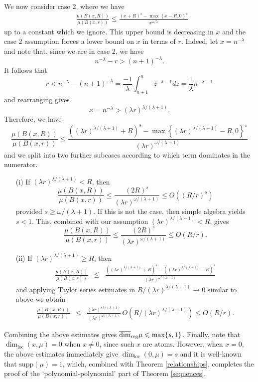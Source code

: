 \documentclass[12pt]{amsart}
\numberwithin{equation}{section}
\renewcommand{\le}{\leqslant}
\renewcommand{\geq}{\geqslant}
\renewcommand{\r}{\overline{\dim}_{\textup{reg}} \mu}
\begin{document}
We now consider case 2, where we have
\begin{align*}
&\frac{\mu(B(x,R))}{\mu(B(x,r))} \le \frac{(x+R)^{s}-\max\left\{x-R,0\right\}^{s}}{x^{\omega/\lambda}}
\end{align*}
up to a constant which we ignore.  This upper bound is decreasing in $x$ and the case 2 assumption forces a lower bound on $x$ in terms of $r$.  Indeed, let $x=n^{-\lambda}$ and note that, since we are in case 2, we have
\[
n^{-\lambda}-  r > (n+1)^{-\lambda}.
\]
It follows that 
\[
r<  n^{-\lambda}- (n+1)^{-\lambda} =  \frac{-1}{\lambda}\int_{n+1}^n z^{-\lambda-1}dz = \frac{1}{\lambda} n^{-\lambda-1}
\]
and rearranging gives
\[
x= n^{-\lambda} > (\lambda r )^{\lambda/(\lambda +1)}.
\]
Therefore, we have
\[
\frac{\mu(B(x,R))}{\mu(B(x,r))} \le   \frac{((\lambda r )^{\lambda/(\lambda +1)}+R)^{s}-\max\left\{(\lambda r )^{\lambda/(\lambda +1)}-R,0\right\}^{s}}{(\lambda r )^{\omega/(\lambda +1)}}
\]
and we split into two further subcases according to which term dominates in the numerator.
\begin{enumerate}
\item[(i)] If $(\lambda r)^{\lambda/(\lambda+1)}<R$, then
\[
\frac{\mu(B(x,R))}{\mu(B(x,r))} \le \frac{(2R)^{s} }{ (\lambda r )^{\omega/(\lambda +1)}}  \le O \left( (R/r)^s \right)
\]
provided $s \geq \omega/(\lambda +1)$.  If this is not the case, then simple algebra yields $s < 1$.  This, combined with our assumption  $(\lambda r)^{\lambda/(\lambda+1)}<R$, gives
\[
\frac{\mu(B(x,R))}{\mu(B(x,r))} \le \frac{(2R)^{s} }{ (\lambda r )^{\omega/(\lambda +1)}}  \le O \left( R/r \right).
\]
\item[(ii)] If $(\lambda r)^{\lambda/(\lambda+1)} \geq R$, then 
\begin{eqnarray*}
\frac{\mu(B(x,R))}{\mu(B(x,r))} &\le& \frac{((\lambda r )^{\lambda/(\lambda +1)}+R)^{s}- ((\lambda r )^{\lambda/(\lambda +1)}-R)^{s}}{(\lambda r )^{\omega/(\lambda +1)}} 
\end{eqnarray*}
and applying Taylor series estimates in $R/(\lambda r)^{\lambda/(\lambda+1)} \to 0$ similar to above we obtain
\begin{eqnarray*}
\frac{\mu(B(x,R))}{\mu(B(x,r))} &\le& \frac{(\lambda r)^{s\lambda/(\lambda+1)}}{(\lambda r )^{\omega/(\lambda +1)}} \, O \left( R/(\lambda r)^{\lambda/(\lambda+1)} \right) \le O \left( R/r \right).
\end{eqnarray*}
\end{enumerate}


Combining the above estimates gives $\r\le\max \{s,1\}$.  Finally, note that $\overline{\dim}_{\text{loc}}(x,\mu)=0$ when $x\neq 0$, since such $x$ are atoms.  However, when $x=0$, the above estimates  immediately give $\overline{\dim}_{\text{loc}}(0,\mu)= s$ and it is well-known that $\text{supp}(\mu) = 1$, which, combined with Theorem \ref{relationships}, completes the proof of the `polynomial-polynomial' part of Theorem \ref{sequences}.
\end{document}
